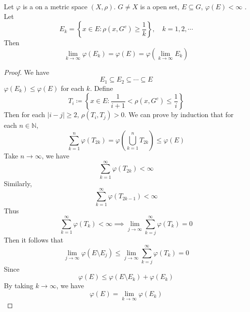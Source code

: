 \documentclass[../main.tex]{subfiles}
\begin{document}
\begin{lemma}{}{}
    Let \(   \varphi   \) is a   on a metric space \(  \left( X,\rho  \right)   \).  \(  G\neq X  \) is a open set, \(  E\subseteq G  \), \(   \varphi \left( E \right)< \infty   \) . Let \[
    E_{k}= \left\{ x \in E : \rho \left( x,G^{c} \right)\ge \frac{1 }{k }   \right\},\quad k= 1,2,\cdots 
    \]  Then \[
    \lim_{k\to \infty} \varphi \left( E_{k} \right)=  \varphi \left( E \right)= \varphi \left( \lim_{k\to \infty}E_{k} \right)   
    \]
\end{lemma}
\begin{proof}
    We have \[
    E_1\subseteq E_2\subseteq \cdots \subseteq E
    \] \(   \varphi \left( E_{k} \right)\le  \varphi \left( E \right)    \) for each \(  k  \).   Define \[
    T_{i}\coloneqq \left\{ x\in E: \frac{1 }{i+ 1 }< \rho \left( x,G^{c} \right)\le \frac{1 }{i }    \right\}
    \]Then for each \(  \left| i-j \right|\ge 2   \), \(  \rho \left( T_{i},T_{j} \right)> 0   \). We can prove by induction that for each \(  n \in \mathbb{N}   \), \[
    \sum _{k= 1}^{n} \varphi \left( T_{2k} \right)=   \varphi \left( \bigcup _{k= 1}^{n}T_{2k} \right) \le  \varphi \left( E \right) 
    \]   Take \(  n\to \infty  \), we have \[
    \sum _{k= 1}^{\infty} \varphi \left( T_{2k} \right)< \infty 
    \]Similarly, \[
    \sum _{k= 1}^{\infty} \varphi \left( T_{2k-1} \right)< \infty 
    \]Thus \[
    \sum _{k= 1}^{\infty} \varphi \left( T_{k} \right)< \infty \implies \lim_{j\to \infty}\sum _{k= j}^{\infty} \varphi \left( T_{k} \right)= 0 
    \]Then it follows that  \[
    \lim_{j\to \infty} \varphi \left( E\setminus E_{j} \right)\le \lim_{j\to \infty}\sum _{k = j}^{\infty} \varphi \left( T_{k} \right)= 0  
    \]Since \[
     \varphi \left( E \right)\le  \varphi \left( E\setminus E_{k} \right)+  \varphi \left( E_{k} \right)   
    \]  By taking \(  k\to \infty  \), we have \[
     \varphi \left( E \right)= \lim_{k\to \infty} \varphi \left( E_{k} \right)  
    \] 
\end{proof}
\end{document}
